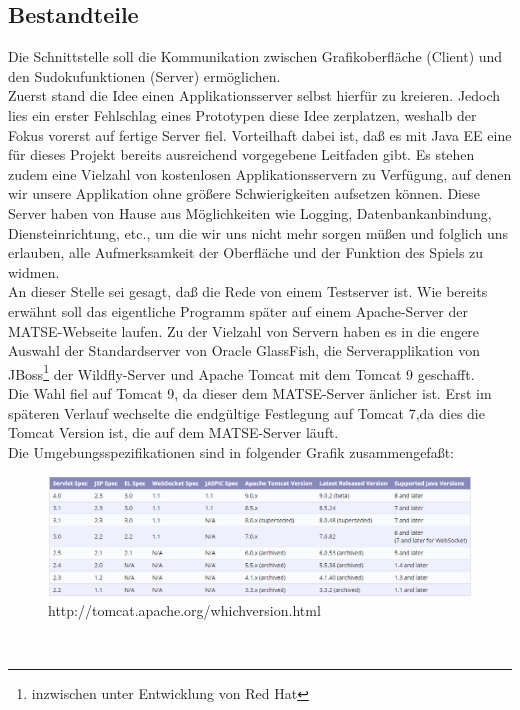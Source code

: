\documentclass[a4paper,12pt]{scrreprt}
\begin{document}
	\subsection{Bestandteile}
	Die Schnittstelle soll die Kommunikation zwischen Grafikoberfl\"ache (Client) und den
	Sudokufunktionen (Server) erm\"oglichen.\medskip \\
	Zuerst stand die Idee einen Applikationsserver selbst hierf\"ur zu kreieren. Jedoch lies ein
	erster Fehlschlag eines Prototypen diese Idee zerplatzen, weshalb der Fokus vorerst auf fertige
	Server fiel. Vorteilhaft dabei ist, da{\ss} es mit Java EE eine f\"ur dieses Projekt bereits
	ausreichend vorgegebene Leitfaden gibt. Es stehen zudem eine Vielzahl von kostenlosen
	Applikationsservern zu Verf\"ugung, auf denen wir unsere Applikation ohne gr\"o{\ss}ere
	Schwierigkeiten aufsetzen k\"onnen. Diese Server haben von Hause aus M\"oglichkeiten wie
	Logging, Datenbankanbindung, Diensteinrichtung, etc., um die wir uns nicht mehr sorgen
	m\"u{\ss}en und folglich uns erlauben, alle Aufmerksamkeit der Oberfl\"ache und der Funktion
	des Spiels zu widmen.\medskip \\
	An dieser Stelle sei gesagt, da{\ss} die Rede von einem Testserver ist. Wie bereits erw\"ahnt soll
	das eigentliche Programm sp\"ater auf einem Apache-Server der MATSE-Webseite laufen. Zu der
	Vielzahl von Servern haben es in die engere Auswahl der Standardserver von Oracle GlassFish,
	die Serverapplikation von JBoss\footnote{inzwischen unter Entwicklung von Red Hat} der
	Wildfly-Server und Apache Tomcat mit dem Tomcat 9 geschafft.\medskip \\
	Die Wahl fiel auf Tomcat 9, da dieser dem MATSE-Server \"anlicher ist. Erst im sp\"ateren Verlauf
	wechselte die endg\"ultige Festlegung auf Tomcat 7,da dies die Tomcat Version ist, die auf dem
	MATSE-Server l\"auft.\medskip \\
	Die Umgebungsspezifikationen sind in folgender Grafik zusammengefa{\ss}t:
	\begin{figure}[h]
		\includegraphics[scale=0.55]{pictures/Tomcat-Versionsvergleich}
		\caption{http://tomcat.apache.org/whichversion.html}
	\end{figure}\\
\end{document}
